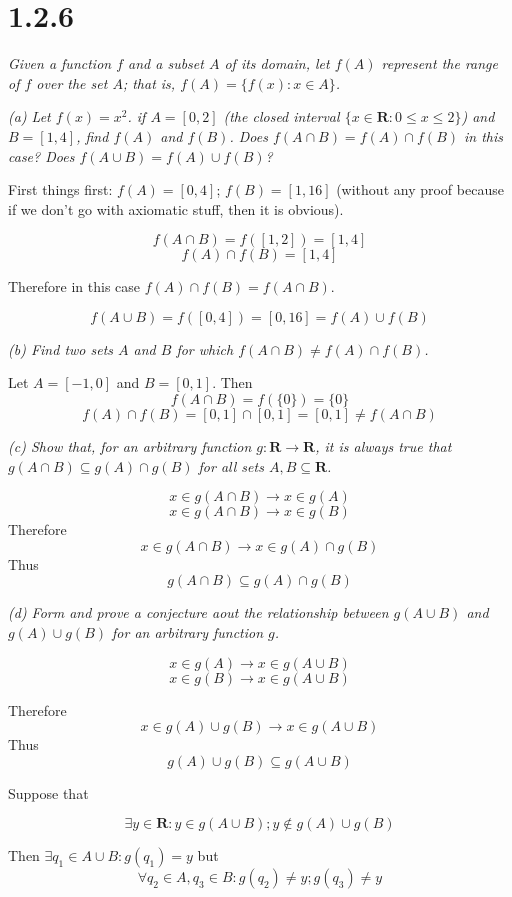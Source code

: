 \documentclass[11pt,oneside,titlepage]{book}
\begin{document}
\section*{1.2.6}
\textit{Given a function $f$ and a subset $A$ of its domain, let $f(A)$
  represent the range of $f$ over the set $A$; that is,
  $f(A) = \{f(x): x \in A\}$. }

\textit{(a) Let $f(x) = x^2$. if $A=[0,2]$ (the closed interval $\{x \in
  \textbf{R}: 0 \leq x \leq 2\}$) and $B=[1,4]$, find $f(A)$ and $f(B)$. Does
  $f (A \cap B) = f(A) \cap f(B)$ in this case? Does $f(A \cup B) = f(A) \cup
  f(B)$? }

First things first: $f(A) = [0, 4]$; $f(B) = [1, 16]$ (without any proof
because if we don't go with axiomatic stuff, then it is obvious).

$$f(A \cap B) = f([1, 2]) = [1, 4]$$
$$f(A) \cap f(B) = [1, 4]$$

Therefore in this case $f(A) \cap f(B) = f(A \cap B)$.

$$f(A \cup B) = f([0, 4]) = [0, 16] = f(A) \cup f(B)$$

\textit{(b) Find two sets $A$ and $B$ for which $f(A \cap B) \neq f(A) \cap f(B)$.}

Let $A = [-1, 0]$ and $B = [0, 1]$. Then
$$f(A \cap B) = f(\{0\}) = \{0\}$$
$$f(A) \cap f(B) = [0, 1] \cap [0, 1] = [0, 1] \neq f(A \cap B)$$

\textit{(c) Show that, for an arbitrary function $g: \textbf{R} \to \textbf{R}$, it
  is always true that $g(A \cap B) \subseteq g(A) \cap g(B)$ for all sets
  $A,B \subseteq \textbf{R}$.}

$$x \in g(A \cap B) \to x \in g(A)$$
$$x \in g(A \cap B) \to x \in g(B)$$
Therefore
$$x \in g(A \cap B) \to x \in g(A) \cap g(B)$$
Thus
$$g(A \cap B) \subseteq g(A) \cap g(B)$$

\textit{(d) Form and prove a conjecture aout the relationship between $g(A \cup B)$ and $g(A) \cup g(B)$ for an arbitrary function $g$.}

$$x \in g(A) \to x \in g(A \cup B)$$
$$x \in g(B) \to x \in g(A \cup B)$$

Therefore
$$x \in g(A) \cup g(B) \to x \in g(A \cup B)$$
Thus
$$g(A) \cup g(B) \subseteq g(A \cup B)$$

Suppose that

$$\exists y \in \textbf{R}: y \in g(A \cup B); y \notin g(A) \cup g(B)$$

Then $\exists q_1 \in A \cup B: g(q_1) = y$ but
$$\forall q_2 \in A, q_3 \in B: g(q_2) \neq y; g(q_3) \neq y$$
\end{document}
